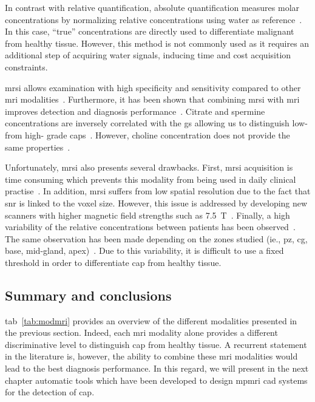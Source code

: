 In contrast with relative quantification, absolute quantification measures
molar concentrations by normalizing relative concentrations using water as
reference~\cite{Lemaitre2011}.
In this case, ``true'' concentrations are directly used to differentiate
malignant from healthy tissue.
However, this method is not commonly used as it requires an additional step of
acquiring water signals, inducing time and cost acquisition constraints.

\ac{mrsi} allows examination with high specificity and sensitivity compared to
other \ac{mri} modalities~\cite{Choi2007}.
Furthermore, it has been shown that combining \ac{mrsi} with \ac{mri} improves
detection and diagnosis
performance~\cite{Scheidler1999a,Kaji1998,Vilanova2009}.
Citrate and spermine concentrations are inversely correlated with the \ac{gs}
allowing us to distinguish low- from high- grade
\acp{cap}~\cite{Giskeodegard2013}.
However, choline concentration does not provide the same
properties~\cite{Giskeodegard2013}.

Unfortunately, \ac{mrsi} also presents several drawbacks.
First, \ac{mrsi} acquisition is time consuming which prevents this modality
from being used in daily clinical practise~\cite{Barentsz2012}.
In addition, \ac{mrsi} suffers from low spatial resolution due to the fact that
\ac{snr} is linked to the voxel size.
However, this issue is addressed by developing new scanners with higher
magnetic field strengths such as \SI{7.5}{\tesla}~\cite{Giskeodegard2013}.
Finally, a high variability of the relative concentrations between patients has
been observed~\cite{Choi2007}.
The same observation has been made depending on the zones studied (ie.,
\ac{pz}, \ac{cg}, base, mid-gland, apex)~\cite{Walker2010,Lemaitre2011}.
Due to this variability, it is difficult to use a fixed threshold in order to
differentiate \ac{cap} from healthy tissue.

\subsection{Summary and conclusions}

\acs{tab}~\ref{tab:modmri} provides an overview of the different modalities
presented in the previous section.
Indeed, each \ac{mri} modality alone provides a different discriminative level
to distinguish \ac{cap} from healthy tissue.
A recurrent statement in the literature is, however, the ability to combine
these \ac{mri} modalities would lead to the best diagnosis performance.
In this regard, we will present in the next chapter automatic tools which have
been developed to design \ac{mpmri} \ac{cad} systems for the detection of
\ac{cap}.


